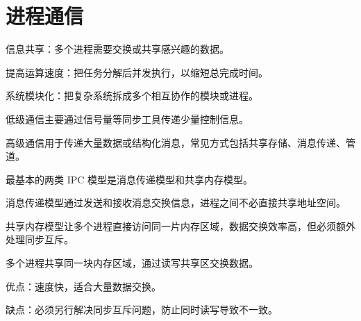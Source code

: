\section{进程通信}
\begin{points}
  \item 信息共享：多个进程需要交换或共享感兴趣的数据。
  \item 提高运算速度：把任务分解后并发执行，以缩短总完成时间。
  \item 系统模块化：把复杂系统拆成多个相互协作的模块或进程。
\end{points}

\begin{points}
  \item 低级通信主要通过信号量等同步工具传递少量控制信息。
  \item 高级通信用于传递大量数据或结构化消息，常见方式包括共享存储、消息传递、管道。
\end{points}

\begin{points}
  \item 最基本的两类 IPC 模型是消息传递模型和共享内存模型。
  \item 消息传递模型通过发送和接收消息交换信息，进程之间不必直接共享地址空间。
  \item 共享内存模型让多个进程直接访问同一片内存区域，数据交换效率高，但必须额外处理同步互斥。
\end{points}


\begin{points}
  \item 多个进程共享同一块内存区域，通过读写共享区交换数据。
  \item 优点：速度快，适合大量数据交换。
  \item 缺点：必须另行解决同步互斥问题，防止同时读写导致不一致。
\end{points}



